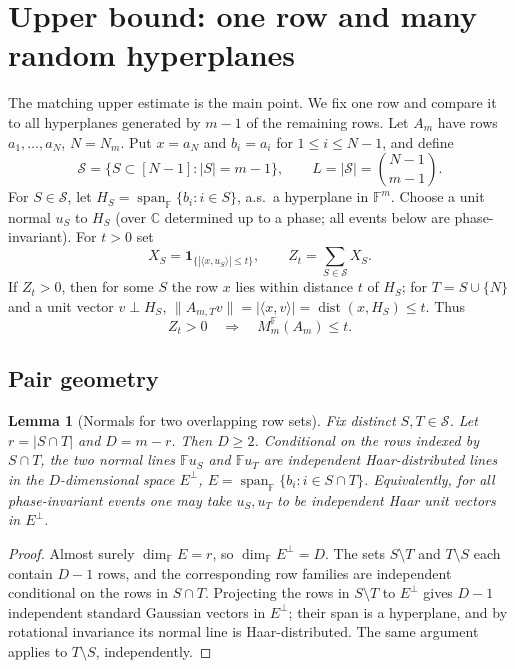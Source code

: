 \documentclass[10pt,a4paper]{amsart}
\newtheorem{lemma}[theorem]{Lemma}
\DeclareMathOperator{\dist}{dist}
\newcommand{\C}{\mathbb{C}}
\newcommand{\F}{\mathbb{F}}
\newcommand{\cS}{\mathcal{S}}
\begin{document}
\section{Upper bound: one row and many random hyperplanes}

The matching upper estimate is the main point. We fix one row and compare it to all hyperplanes
generated by $m-1$ of the remaining rows. Let $A_m$ have rows $a_1,\ldots,a_N$, $N=N_m$. Put
$x=a_N$ and $b_i=a_i$ for $1\le i\le N-1$, and define
\[
  \cS=\{S\subset[N-1]: |S|=m-1\},\qquad L=|\cS|=\binom{N-1}{m-1}.
\]
For $S\in\cS$, let $H_S=\operatorname{span}_\F\{b_i:i\in S\}$, a.s.\ a hyperplane in $\F^m$. Choose a
unit normal $u_S$ to $H_S$ (over $\C$ determined up to a phase; all events below are phase-invariant).
For $t>0$ set
\begin{equation}\label{eq:Z-def}
  X_S=\mathbf1_{\{|\langle x,u_S\rangle|\le t\}},
  \qquad Z_t=\sum_{S\in\cS}X_S.
\end{equation}
If $Z_t>0$, then for some $S$ the row $x$ lies within distance $t$ of $H_S$; for $T=S\cup\{N\}$ and a
unit vector $v\perp H_S$, $\|A_{m,T}v\|=|\langle x,v\rangle|=\dist(x,H_S)\le t$. Thus
\begin{equation}\label{eq:Z-implies}
  Z_t>0\quad\Longrightarrow\quad M_m^\F(A_m)\le t.
\end{equation}

\subsection{Pair geometry}

\begin{lemma}[Normals for two overlapping row sets]\label{lem:normals}
Fix distinct $S,T\in\cS$. Let $r=|S\cap T|$ and $D=m-r$. Then $D\ge2$. Conditional on the rows indexed
by $S\cap T$, the two normal lines $\F u_S$ and $\F u_T$ are independent Haar-distributed lines in the
$D$-dimensional space $E^\perp$, $E=\operatorname{span}_\F\{b_i:i\in S\cap T\}$. Equivalently, for all
phase-invariant events one may take $u_S,u_T$ to be independent Haar unit vectors in $E^\perp$.
\end{lemma}

\begin{proof}
Almost surely $\dim_\F E=r$, so $\dim_\F E^\perp=D$. The sets $S\setminus T$ and $T\setminus S$ each
contain $D-1$ rows, and the corresponding row families are independent conditional on the rows in
$S\cap T$. Projecting the rows in $S\setminus T$ to $E^\perp$ gives $D-1$ independent standard Gaussian
vectors in $E^\perp$; their span is a hyperplane, and by rotational invariance its normal line is
Haar-distributed. The same argument applies to $T\setminus S$, independently.
\end{proof}
\end{document}
